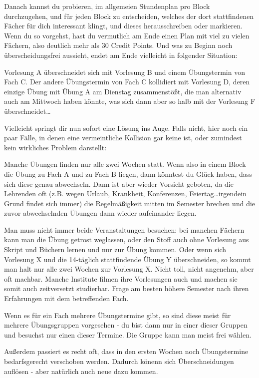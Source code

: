 \begin{multicols}{2}
Danach kannst du probieren, im allgemeien Stundenplan pro Block durchzugehen, und für jeden Block zu entscheiden, welches der dort stattfindenen Fächer für dich interessant klingt, und dieses herausschreiben oder markieren. Wenn du so vorgehst, hast du vermutlich am Ende einen Plan mit viel zu vielen Fächern, also deutlich mehr als 30 Credit Points. Und was zu Beginn noch überscheidungsfrei aussieht, endet am Ende vielleicht in folgender Situation:

Vorlesung A überschneidet sich mit Vorlesung B und einem Übungstermin von Fach C. Der andere Übungstermin von Fach C kollidiert mit Vorlesung D, deren einzige Übung mit Übung A am Dienstag zusammenstößt, die man alternativ auch am Mittwoch haben könnte, was sich dann aber so halb mit der Vorlesung F überschneidet\ldots

Vielleicht springt dir nun sofort eine Lösung ins Auge. Falls nicht, hier noch ein paar Fälle, in denen eine vermeintliche Kollision gar keine ist, oder zumindest kein wirkliches Problem darstellt:

Manche Übungen finden nur alle zwei Wochen statt. Wenn also in einem Block die Übung zu Fach A und zu Fach B liegen, dann könntest du Glück haben, dass sich diese genau abwechseln. Dann ist aber wieder Vorsicht geboten, da die Lehrenden oft (z.B. wegen Urlaub, Krankheit, Konferenzen, Feiertag\ldots irgendein Grund findet sich immer) die Regelmäßigkeit mitten im Semester brechen und die zuvor abwechselnden Übungen dann wieder aufeinander liegen.

Man muss nicht immer beide Veranstaltungen besuchen: bei manchen Fächern kann man die Übung getrost weglassen, oder den Stoff auch ohne Vorlesung aus Skript und Büchern lernen und nur zur Übung kommen. Oder wenn sich Vorlesung X und die 14-täglich stattfindende Übung Y überschneiden, so kommt man halt nur alle zwei Wochen zur Vorlesung X. Nicht toll, nicht angenehm, aber oft machbar. Manche Institute filmen ihre Vorlesungen auch und machen sie somit auch zeitversetzt studierbar. Frage am besten höhere Semester nach ihren Erfahrungen mit dem betreffenden Fach.

Wenn es für ein Fach mehrere Übungstermine gibt, so sind diese meist für mehrere Übungsgruppen vorgesehen - du bist dann nur in einer dieser Gruppen und besuchst nur einen dieser Termine. Die Gruppe kann man meist frei wählen.

Außerdem passiert es recht oft, dass in den ersten Wochen noch Übungstermine bedarfsgerecht verschoben werden. Dadurch könenn sich Überschneidungen auflösen - aber natürlich auch neue dazu kommen.


\end{multicols}
